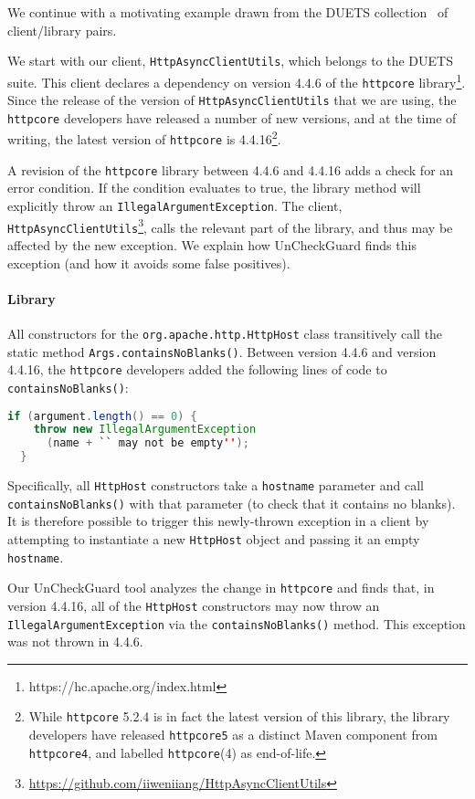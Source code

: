 We continue with a motivating example drawn from the DUETS collection~\cite{durieux21:_duets}
of client/library pairs. 

We start with our client, \texttt{HttpAsyncClientUtils}, which belongs to the DUETS suite. This client declares a dependency on
version 4.4.6 of the \texttt{httpcore} library\footnote{https://hc.apache.org/index.html}. Since the release of the version of \texttt{HttpAsyncClientUtils} that we are using, the \texttt{httpcore} developers
have released a number of new versions, and at the time of writing, the latest version of \texttt{httpcore}
is 4.4.16\footnote{While \texttt{httpcore} 5.2.4 is in fact the latest version of this library, the library developers have released \texttt{httpcore5} as a distinct Maven component from \texttt{httpcore4}, and labelled \texttt{httpcore}(4) as end-of-life.}.

A revision of the \texttt{httpcore} library between 4.4.6 and 4.4.16 adds a check for an
error condition.  If the condition evaluates to true, the library method will
explicitly throw an \texttt{IllegalArgumentException}. The client, \texttt{HttpAsyncClientUtils}\footnote{\url{https://github.com/iiweniiang/HttpAsyncClientUtils}},
calls the relevant part of the library, and thus may be affected by the new exception. We explain how UnCheckGuard finds this exception (and how it avoids some false positives).


\paragraph{Library} All constructors for the \texttt{org.apache.http.HttpHost} class transitively call
the static method \texttt{Args.containsNoBlanks()}. Between version 4.4.6 and version 4.4.16, the \texttt{httpcore}
developers added the following lines of code to \texttt{containsNoBlanks()}:
\begin{lstlisting}[language=Java]
  if (argument.length() == 0) {
    throw new IllegalArgumentException
      (name + `` may not be empty'');
  }
\end{lstlisting}
Specifically, all \texttt{HttpHost} constructors take a \texttt{hostname} parameter and call \texttt{containsNoBlanks()}
with that parameter (to check that it contains no blanks). It is therefore possible to trigger this newly-thrown
exception in a client by attempting to instantiate a new \texttt{HttpHost} object and passing it an empty
\texttt{hostname}.

Our UnCheckGuard tool analyzes the change in \texttt{httpcore} and finds that, in
version 4.4.16, all of the \texttt{HttpHost} constructors may now throw an
\texttt{IllegalArgumentException} via the \texttt{containsNoBlanks()} method.
This exception was not thrown in 4.4.6.

